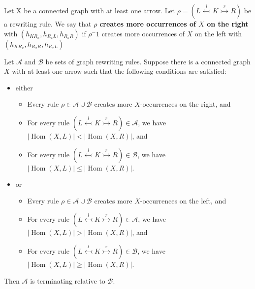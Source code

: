 
\begin{definition}
    \label{def:creates_more_x_on_the_right}
    Let X be a connected graph with at least one arrow. Let $\rho = (L \overset{l}{\leftarrowtail} K \overset{r}{\rightarrowtail} R)$ be a rewriting rule. We say that \( \rho \) \textbf{creates more occurrences of $X$ on the right} with $(h_{KR_x}, h_{R_xL}, h_{R_xR})$ if \( \rho^-1 \) creates more occurrences of $X$ on the left with $(h_{KR_x}, h_{R_xR}, h_{R_xL})$
\end{definition}

\begin{theorem}
  \label{thm:termination_gls_complex_graph}
  Let \(\mathcal{A}\) and \(\mathcal{B}\) be sets of graph rewriting rules. Suppose there is a connected graph \(X\) with at least one arrow such that the following conditions are satisfied:
  \begin{itemize}
    \item either
      \begin{itemize}
          \item Every rule \(\rho \in \mathcal{A} \cup \mathcal{B}\) creates more \(X\)-occurrences on the right, and
          \item For every rule \(\left( L \overset{l}{\leftarrowtail} K \overset{r}{\rightarrowtail} R \right) \in \mathcal{A}\), we have \(|\operatorname{Hom}(X,L)| < |\operatorname{Hom}(X,R)|\), and
          \item For every rule \(\left( L \overset{l}{\leftarrowtail} K \overset{r}{\rightarrowtail} R \right) \in \mathcal{B}\), we have \(|\operatorname{Hom}(X,L)| \leq |\operatorname{Hom}(X,R)|\).
      \end{itemize}
    \item or 
    \begin{itemize}
      \item Every rule \(\rho \in \mathcal{A} \cup \mathcal{B}\) creates more \(X\)-occurrences on the left, and
      \item For every rule \(\left( L \overset{l}{\leftarrowtail} K \overset{r}{\rightarrowtail} R \right) \in \mathcal{A}\), we have \(|\operatorname{Hom}(X,L)| > |\operatorname{Hom}(X,R)|\), and
      \item For every rule \(\left( L \overset{l}{\leftarrowtail} K \overset{r}{\rightarrowtail} R \right) \in \mathcal{B}\), we have \(|\operatorname{Hom}(X,L)| \geq |\operatorname{Hom}(X,R)|\).
  \end{itemize}
\end{itemize}
  Then \(\mathcal{A}\) is terminating relative to \(\mathcal{B}\).
\end{theorem}

